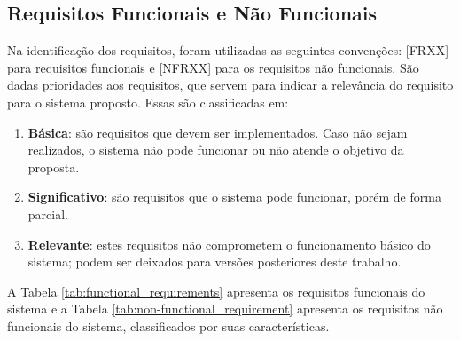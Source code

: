 \subsection{Requisitos Funcionais e Não Funcionais}
\label{subsec:functional_requirements}

Na identificação dos requisitos, foram utilizadas as seguintes convenções: [FRXX] para requisitos funcionais e [NFRXX] para os requisitos não funcionais. São dadas prioridades aos requisitos, que servem para indicar a relevância do requisito para o sistema proposto. Essas são classificadas em: 

\begin{enumerate}
    \item \textbf{Básica}: são requisitos que devem ser implementados. Caso não sejam realizados, o sistema não pode funcionar ou não atende o objetivo da proposta.
    \item \textbf{Significativo}: são requisitos que o sistema pode funcionar, porém de forma parcial.
    \item \textbf{Relevante}: estes requisitos não comprometem o funcionamento básico do sistema; podem ser deixados para versões posteriores deste trabalho.
\end{enumerate}

A Tabela \ref{tab:functional_requirements} apresenta os requisitos funcionais do sistema e a Tabela \ref{tab:non-functional_requirement} apresenta os requisitos não funcionais do sistema, classificados por suas características.

